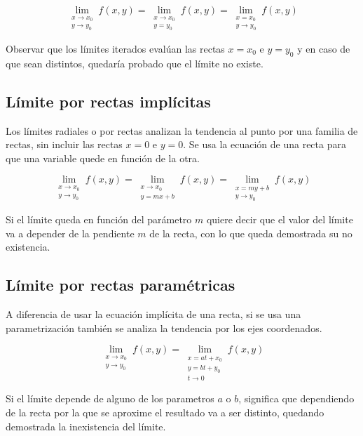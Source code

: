 \documentclass[a5paper,12pt,twoside]{book}
\begin{document}
\begin{equation*}
    \lim_{\substack{x \to x_0\\y \to y_0}} f(x,y)
    = \lim_{\substack{x \to x_0\\y = y_0}} f(x,y)
    = \lim_{\substack{x = x_0\\y \to y_0}} f(x,y)
\end{equation*}

Observar que los límites iterados evalúan las rectas $x=x_0$ e $y=y_0$ y en caso de que sean distintos, quedaría probado que el límite no existe.

\subsection{Límite por rectas implícitas}

Los límites radiales o por rectas analizan la tendencia al punto por una familia de rectas, sin incluir las rectas $x=0$ e $y=0$.
Se usa la ecuación de una recta para que una variable quede en función de la otra.

\begin{equation*}
    \lim_{\substack{x \to x_0\\y \to y_0}} f(x,y)
    = \lim_{\substack{x \to x_0\\y=mx+b}} f(x,y)
    = \lim_{\substack{x=my+b\\y \to y_0}} f(x,y)
\end{equation*}

Si el límite queda en función del parámetro $m$ quiere decir que el valor del límite va a depender de la pendiente $m$ de la recta, con lo que queda demostrada su no existencia.


\subsection{Límite por rectas paramétricas}

A diferencia de usar la ecuación implícita de una recta, si se usa una parametrización también se analiza la tendencia por los ejes coordenados.

\begin{equation*}
    \lim_{\substack{x \to x_0\\y \to y_0}} f(x,y)
    = \lim_{\substack{x=at+x_0\\y=bt+y_0\\t \to 0}} f(x,y)
\end{equation*}

Si el límite depende de alguno de los parametros $a$ o $b$, significa que dependiendo de la recta por la que se aproxime el resultado va a ser distinto, quedando demostrada la inexistencia del límite.
\end{document}
